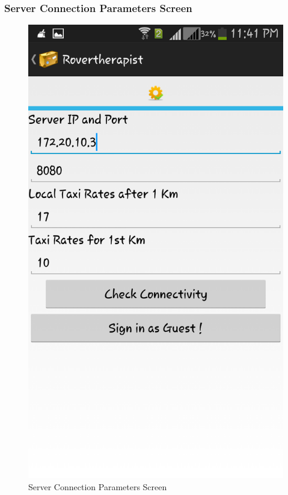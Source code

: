 \documentclass[12pt,a4paper]{article}
\begin{document}
\subsubsection{Server Connection Parameters Screen}
\begin{figure}[!htb]
\centering
\includegraphics[width=12 cm]{server}
\caption{Server Connection Parameters Screen}
\end{figure}
\\
\end{document}
